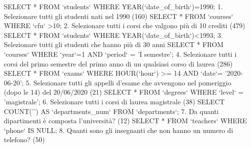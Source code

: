SELECT * FROM `students` WHERE YEAR(`date_of_birth`)=1990; 1. Selezionare tutti gli studenti nati nel 1990 (160)
SELECT * FROM `courses` WHERE `cfu` >10;  2. Selezionare tutti i corsi che valgono più di 10 crediti (479)
SELECT * FROM `students` WHERE YEAR(`date_of_birth`)<1993; 3. Selezionare tutti gli studenti che hanno più di 30 anni 
SELECT * FROM `courses` WHERE `year`=1 AND `period` = 'I semestre'; 4. Selezionare tutti i corsi del primo semestre del primo anno di un qualsiasi corso di
laurea (286)
SELECT * FROM `exams` WHERE HOUR(`hour`) >= 14 AND `date`= '2020-06-20'; 5. Selezionare tutti gli appelli d'esame che avvengono nel pomeriggio (dopo le 14) del
20/06/2020 (21)
SELECT * FROM `degrees` WHERE `level` = 'magistrale'; 6. Selezionare tutti i corsi di laurea magistrale (38)
SELECT COUNT('') AS `departments_num` FROM `departments`; 7. Da quanti dipartimenti è composta l'università? (12)
SELECT * FROM `teachers` WHERE `phone` IS NULL; 8. Quanti sono gli insegnanti che non hanno un numero di telefono? (50)